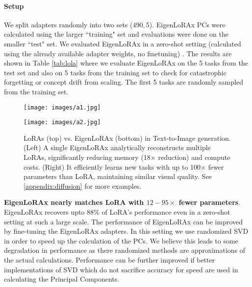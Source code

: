 \paragraph{Setup} 
We split adapters randomly into two sets ($490, $5). EigenLoRAx PCs were calculated using the larger ``training" set and evaluations were done on the smaller ``test" set. We evaluated EigenLoRAx in a zero-shot setting (calculated using the already available adapter weights, no finetuning) . The results are shown in Table \ref{tab:lola} where we evaluate EigenLoRAx on the 5 tasks from the test set and also on 5 tasks from the training set to check for catastrophic forgetting or concept drift from scaling. The first 5 tasks are randomly sampled from the training set.
\begin{figure*}[!htb]
    \centering
    \begin{minipage}{0.49\textwidth}
        \centering
        \texttt{[image: images/a1.jpg]} %
    \end{minipage}\hfill
    \begin{minipage}{0.49\textwidth}
        \centering
        \texttt{[image: images/a2.jpg]} %
    \end{minipage}
    \caption{\small{LoRAs (top) vs. EigenLoRAx (bottom) in Text-to-Image generation. (Left) A single EigenLoRAx analytically reconstructs multiple LoRAs, significantly reducing memory (18$\times$ reduction) and compute costs. (Right) It efficiently learns new tasks with up to 100$\times$ fewer parameters than LoRA, maintaining similar visual quality. See \cref{appendix:diffusion} for more examples.}}
    \label{fig:diffusion_joint}
\end{figure*}
\textbf{EigenLoRAx nearly matches LoRA with $12 - 95\times$ fewer parameters}. EigenLoRAx recovers upto 88\% of LoRA's performance even in a zero-shot setting at such a large scale. The performance of EigenLoRAx can be improved by fine-tuning the EigenLoRAx adapters. In this setting we use randomized SVD in order to speed up the calculation of the PCs. We believe this leads to some degradation in performance as there randomized methods are approximations of the actual calculations. Performance can be further improved if better implementations of SVD which do not sacrifice accuracy for speed are used in calculating the Principal Components.

